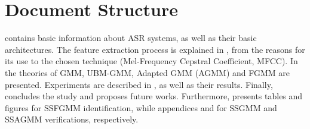 \section{Document Structure}

 contains basic information about ASR systems, as well as their basic architectures. The feature extraction process is explained in , from the reasons for its use to the chosen technique (Mel-Frequency Cepstral Coefficient, MFCC). In  the theories of GMM, UBM-GMM, Adapted GMM (AGMM) and FGMM are presented. Experiments are described in , as well as their results. Finally,  concludes the study and proposes future works. Furthermore,  presents tables and figures for SSFGMM identification, while appendices  and  for SSGMM and SSAGMM verifications, respectively.